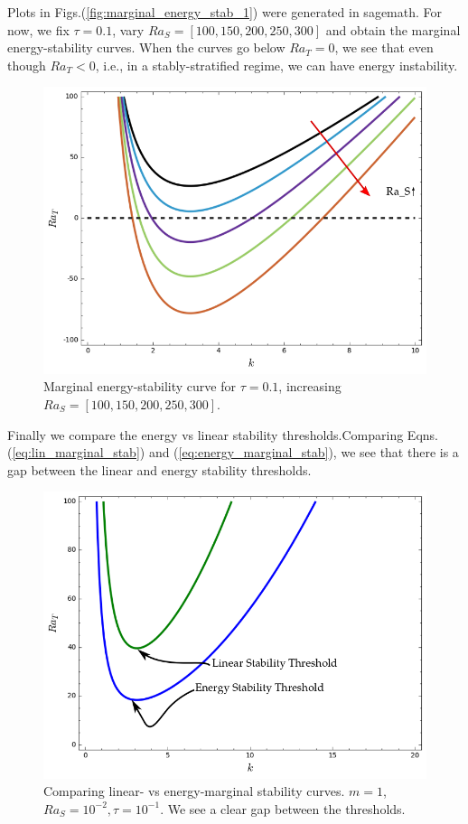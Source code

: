 \documentclass{article}
\begin{document}
Plots in Figs.(\ref{fig:marginal_energy_stab_1}) were generated in sagemath. 
For now, we fix $\tau = 0.1$, vary $Ra_{S} = [100, 150, 200, 250, 300]$ and obtain the marginal energy-stability curves. When the curves go below $Ra_{T} = 0$, we see that even though $Ra_{T} < 0$, i.e., in a stably-stratified regime, we can have energy instability. 
\begin{figure}[H]
    \centering
    \includegraphics[scale = 0.3]{Figs/energy_stab_Ra_T_vs_k_tau_0_1_vary_Ra_S.png}
    \caption{Marginal energy-stability curve for $\tau = 0.1$, increasing $Ra_{S} = [100, 150, 200, 250, 300]$.}
    \label{fig:energy_stab_Ra_T_vs_k_tau_0_1_vary_Ra_S}
\end{figure}
Finally we compare the energy vs linear stability thresholds.Comparing Eqns.(\ref{eq:lin_marginal_stab}) and (\ref{eq:energy_marginal_stab}), we see that there is a gap between the linear and energy stability thresholds. 
\begin{figure}[H]
    \centering
    \includegraphics[scale = 0.3]{Figs/lin_vs_energy_stab.png}
    \caption{Comparing linear- vs energy-marginal stability curves. $m = 1$, $Ra_S = 10^{-2}, \tau = 10^{-1}$. We see a clear gap between the thresholds.}
    \label{fig:lin_vs_energy_stab}
\end{figure}
\end{document}
